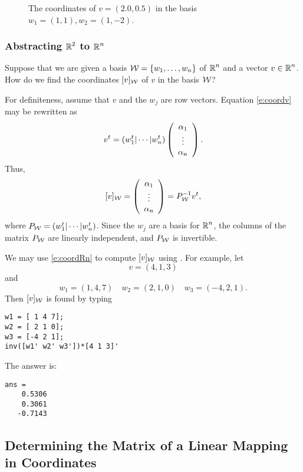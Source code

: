 \documentclass{ximera}
\begin{document}
\begin{figure}[htb]
     \centerline{%
     }
     \caption{The coordinates of $v=(2.0,0.5)$ in the basis
	$w_1=(1,1), w_2=(1,-2)$.}
     \label{F:coords}
\end{figure}

\subsubsection*{Abstracting $\mbox{$\Bbb{R}$}^2$ to $\mbox{$\Bbb{R}$}^n$}

Suppose that we are given a basis ${\cal W} = \{w_1,\ldots,w_n\}$ of
$\mbox{$\Bbb{R}$}^n$ and a vector $v\in\mbox{$\Bbb{R}$}^n$.  How do we find the coordinates
$[v]_{\cal W}$ of $v$ in the basis ${\cal W}$?

For definiteness, assume that $v$ and the $w_j$ are row vectors.  Equation
\eqref{e:coordv} may be rewritten as
\[
v^t = (w_1^t|\cdots|w_n^t)\left(\begin{array}{c} \alpha_1 \\ \vdots \\ \alpha_{n}\end{array}\right).
\]
Thus,
\begin{equation}  \label{e:coordRn}
[v]_{\cal W} = \left(\begin{array}{c} \alpha_1 \\ \vdots \\ \alpha_{n}\end{array}\right) = P_{\cal W}^{-1} v^t,
\end{equation}
where $P_{\cal W} = (w_1^t|\cdots|w_n^t)$.  Since the $w_j$ are a basis for
$\mbox{$\Bbb{R}$}^n$, the columns of the matrix $P_{\cal W}$ are linearly independent, and
$P_{\cal W}$ is invertible.


We may use \eqref{e:coordRn} to compute $[v]_{\cal W}$ using
\Matlabp.  For example, let
\[
v  =  (4,1,3)
\]
and
\[
w_1 =  (1,4,7) \quad w_2 = (2,1,0) \quad w_3 = (-4,2,1).
\]
Then $[v]_{\cal W}$ is found by typing
\begin{verbatim}
w1 = [ 1 4 7];
w2 = [ 2 1 0];
w3 = [-4 2 1];
inv([w1' w2' w3'])*[4 1 3]'
\end{verbatim}   
The answer is:

\begin{verbatim}
ans =
    0.5306
    0.3061
   -0.7143
\end{verbatim}


\subsection*{Determining the Matrix of a Linear Mapping in Coordinates}
\end{document}
